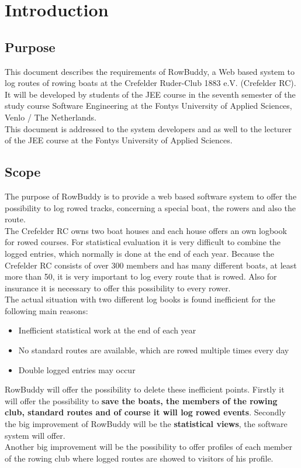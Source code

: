 \section{Introduction}

	\subsection{Purpose}
	This document describes the requirements of RowBuddy, a Web based system to log routes of rowing boats at the Crefelder Ruder-Club 1883 e.V. (Crefelder RC). It will be developed by students of the JEE course in the seventh semester of the study course Software Engineering at the Fontys University of Applied Sciences, Venlo / The Netherlands.\\
	
	This document is addressed to the system developers and as well to the lecturer of the JEE course at the Fontys University of Applied Sciences.
	
	
	\subsection{Scope}
	\label{scope}
	The purpose of RowBuddy is to provide a web based software system to offer the possibility to log rowed tracks, concerning a special boat, the rowers and also the route.\\
	
	The Crefelder RC owns two boat houses and each house offers an own logbook for rowed courses. For statistical evaluation it is very difficult to combine the logged entries, which normally is done at the end of each year. Because the Crefelder RC consists of over 300 members and has many different boats, at least more than 50, it is very important to log every route that is rowed. Also for insurance it is necessary to offer this possibility to every rower.\\
	
	The actual situation with two different log books is found inefficient for the following main reasons:
	\begin{itemize}
		\item Inefficient statistical work at the end of each year
		\item No standard routes are available, which are rowed multiple times every day
		\item Double logged entries may occur
	\end{itemize}
	
	RowBuddy will offer the possibility to delete these inefficient points. Firstly it will offer the possibility to \textbf{save the boats, the members of the rowing club, standard routes and of course it will log rowed events}. Secondly the big improvement of RowBuddy will be the \textbf{statistical views}, the software system will offer.\\
	Another big improvement will be the possibility to offer profiles of each member of the rowing club where logged routes are showed to visitors of his profile.\\
	
